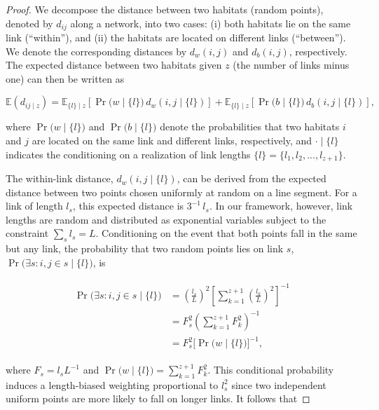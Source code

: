 \documentclass[11pt, class=article, crop=false]{standalone}
\theoremstyle{definition}
\begin{document}
\begin{proof}
We decompose the distance between two habitats (random points), denoted by $d_{ij}$ along a network, into two cases: (i) both habitats lie on the same link (``within''), and (ii) the habitats are located on different links (``between'').
We denote the corresponding distances by $d_w(i,j)$ and $d_b(i,j)$, respectively.
The expected distance between two habitats given $z$ (the number of links minus one) can then be written as

\begin{equation}
\mathbb{E}(d_{ij\mid z})
    =
    \mathbb{E}_{\{l\}\mid z}
    \left[
    \Pr \bigl(w \mid \{l\} \bigr)\, d_w(i,j \mid \{l\})
    \right]
    +
    \mathbb{E}_{\{l\} \mid z}
    \left[
    \Pr \bigl(b \mid \{l\} \bigr)\, d_b(i,j \mid \{l\})
    \right],
\label{eq:mu-d-z}
\end{equation}

where $\Pr \bigl(w \mid \{l\} \bigr)$ and $\Pr \bigl(b \mid \{l\} \bigr)$ denote the probabilities that two habitats $i$ and $j$ are located on the same link and different links, respectively, and $\cdot \mid \{l\}$ indicates the conditioning on a realization of link lengths $\{l\} = \{l_1, l_2, ..., l_{z+1}\}$.

The within-link distance, $d_w(i,j \mid \{l\})$, can be derived from the expected distance between two points chosen uniformly at random on a line segment. 
For a link of length $l_s$, this expected distance is $3^{-1}\,l_s$.
In our framework, however, link lengths are random and distributed as exponential variables subject to the constraint $\sum_s l_s = L$. 
Conditioning on the event that both points fall in the same but any link, the probability that two random points lies on link $s$, $\Pr\bigl(\exists s: i, j\in s\mid\{l\} \bigr)$, is

\begin{align}
    \begin{split}
    \Pr\bigl(\exists s: i, j\in s\mid\{l\} \bigr)
    &= 
    \left(
        \frac{l_s}{L}
    \right)^{2} 
    \left[
        \sum_{k=1}^{z+1} \left( \frac{l_k}{L}\right)^2
    \right]^{-1}\\
    &= 
    F_s^{2} 
    \left(
        \sum_{k=1}^{z+1} F_k^2
    \right)^{-1}\\
    &= 
    F_s^{2} 
    \bigl[
        \Pr\bigl(w \mid \{l\}\bigr)
    \bigr]^{-1},
    \end{split}
\end{align}

where $F_s = l_s L^{-1}$ and $\Pr \bigl(w \mid \{l\} \bigr) = \sum_{k=1}^{z+1} F_k^2$.
This conditional probability induces a length-biased weighting proportional to $l_s^2$ since two independent uniform points are more likely to fall on longer links.
It follows that


\end{proof}
\end{document}
